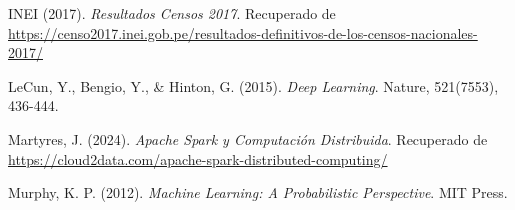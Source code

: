 \begin{thebibliography}{9}
		\item INEI (2017). \textit{Resultados Censos 2017}. Recuperado de \href{https://censo2017.inei.gob.pe/resultados-definitivos-de-los-censos-nacionales-2017/}{https://censo2017.inei.gob.pe/resultados-definitivos-de-los-censos-nacionales-2017/}
		\item LeCun, Y., Bengio, Y., \& Hinton, G. (2015). \textit{Deep Learning}. Nature, 521(7553), 436-444.
		\item Martyres, J. (2024). \textit{Apache Spark y Computación Distribuida}. Recuperado de \href{https://cloud2data.com/apache-spark-distributed-computing/}{https://cloud2data.com/apache-spark-distributed-computing/}
		\item Murphy, K. P. (2012). \textit{Machine Learning: A Probabilistic Perspective}. MIT Press. 
		
	\end{thebibliography}
	


